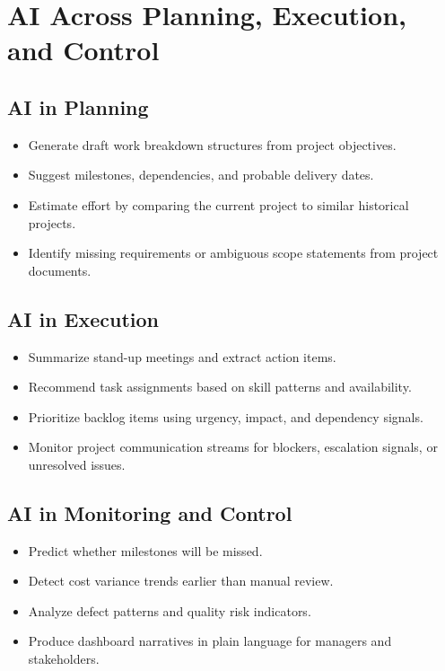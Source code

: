 \documentclass[11pt,a4paper]{article}
\begin{document}
\section{AI Across Planning, Execution, and Control}

\subsection{AI in Planning}

\begin{itemize}[leftmargin=*]
  \item Generate draft work breakdown structures from project objectives.
  \item Suggest milestones, dependencies, and probable delivery dates.
  \item Estimate effort by comparing the current project to similar historical projects.
  \item Identify missing requirements or ambiguous scope statements from project documents.
\end{itemize}

\subsection{AI in Execution}

\begin{itemize}[leftmargin=*]
  \item Summarize stand-up meetings and extract action items.
  \item Recommend task assignments based on skill patterns and availability.
  \item Prioritize backlog items using urgency, impact, and dependency signals.
  \item Monitor project communication streams for blockers, escalation signals, or unresolved issues.
\end{itemize}

\subsection{AI in Monitoring and Control}

\begin{itemize}[leftmargin=*]
  \item Predict whether milestones will be missed.
  \item Detect cost variance trends earlier than manual review.
  \item Analyze defect patterns and quality risk indicators.
  \item Produce dashboard narratives in plain language for managers and stakeholders.
\end{itemize}
\end{document}
